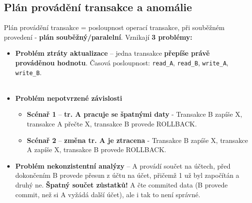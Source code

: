 \subsection{Plán provádění transakce a anomálie}
Plán provádění transakce = posloupnost operací transakce, při souběžném provedení - \textbf{plán souběžný/paralelní}. Vznikají \textbf{3 problémy:}
\begin{itemize}
    \item \textbf{Problém ztráty aktualizace} -- jedna transakce \textbf{přepíše právě prováděnou hodnotu}. Časová posloupnost: \texttt{read\_A}, \texttt{read\_B}, \texttt{write\_A}, \texttt{write\_B}.
          \\\\
          \noindent{}
    \item \textbf{Problém nepotvrzené závislosti}
          \begin{itemize}
              \item \textbf{Scénař 1} -- \textbf{tr. A pracuje se špatnými daty} - Transakce B zapíše X, transakce A přečte X, transakce B provede ROLLBACK.
              \item \textbf{Scénař 2} -- \textbf{změna tr. A je ztracena} - Transakce B zapíše X, transakce A zapíše X, transakce B provede ROLLBACK.
          \end{itemize}
          \noindent{}
    \item \textbf{Problém nekonzistentní analýzy} -- A provádí součet na účtech, před dokončením B provede přesun z účtu na účet, přičemž 1 už byl započítán a druhý ne. \textbf{Špatný součet zůstatků!} A čte commited data (B provede commit, než si A vyžádá další účet), ale i tak to není správné.
          \\\\
          \noindent{}
\end{itemize}

